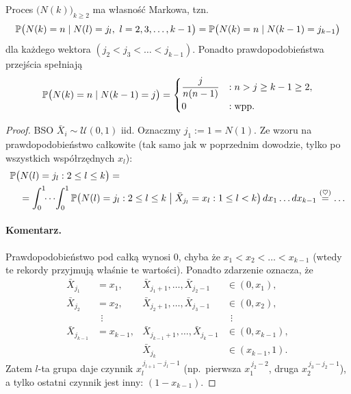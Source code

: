 \documentclass[dvipsnames]{book}
\begin{document}
\hrulefill

\begin{twierdzenie}
Proces $\big(N(k)\big)_{k \geq 2}$ ma własność Markowa, tzn.
\[
  \P\big(N(k) = n \mid N(l) = j_l,\ l = 2, 3, \ldots, k-1\big)
  = \P\big(N(k) = n \mid N(k-1) = j_{k-1}\big)
\]
dla każdego wektora $(j_2 < j_3 < \ldots < j_{k-1})$. Ponadto
prawdopodobieństwa przejścia spełniają
\[
  \P\big(N(k) = n \mid N(k-1) = j\big) =
  \begin{cases}
    \dfrac{j}{n(n-1)} & : n > j \geq k-1 \geq 2, \\[2mm]
    0 & : \text{wpp.}
  \end{cases}
\]
\end{twierdzenie}

\begin{proof}
BSO $\bar X_i \sim \mathcal{U}(0,1)$ iid. Oznaczmy $j_1 := 1 = N(1)$. Ze wzoru na
prawdopodobieństwo całkowite (tak samo jak w poprzednim dowodzie, tylko po
wszystkich współrzędnych $x_l$):
\begin{align*}
  &\P\big(N(l) = j_l : 2 \leq l \leq k\big) = \\
  &\quad = \int_0^1 \!\!\cdots\! \int_0^1
    \P\big(N(l) = j_l : 2 \leq l \leq k \;\big|\;
    \bar X_{j_l} = x_l : 1 \leq l < k\big)\, dx_1 \ldots dx_{k-1}
  \overset{(\heartsuit)}{=} \ldots
\end{align*}

\paragraph{Komentarz.}
Prawdopodobieństwo pod całką wynosi $0$, chyba że
$x_1 < x_2 < \ldots < x_{k-1}$ (wtedy te rekordy przyjmują właśnie te
wartości). Ponadto zdarzenie oznacza, że
\begin{align*}
  \bar X_{j_1} &= x_1, & \bar X_{j_1+1}, \ldots, \bar X_{j_2-1} &\in (0, x_1), \\
  \bar X_{j_2} &= x_2, & \bar X_{j_2+1}, \ldots, \bar X_{j_3-1} &\in (0, x_2), \\
  &\ \ \vdots & &\ \ \vdots \\
  \bar X_{j_{k-1}} &= x_{k-1}, & \bar X_{j_{k-1}+1}, \ldots, \bar X_{j_k-1} &\in (0, x_{k-1}), \\
  & & \bar X_{j_k} &\in (x_{k-1}, 1).
\end{align*}
Zatem $l$-ta grupa daje czynnik $x_l^{\,j_{l+1} - j_l - 1}$ (np.\ pierwsza
$x_1^{\,j_2 - 2}$, druga $x_2^{\,j_3 - j_2 - 1}$), a tylko ostatni czynnik jest
inny: $(1 - x_{k-1})$.


\end{proof}
\end{document}
